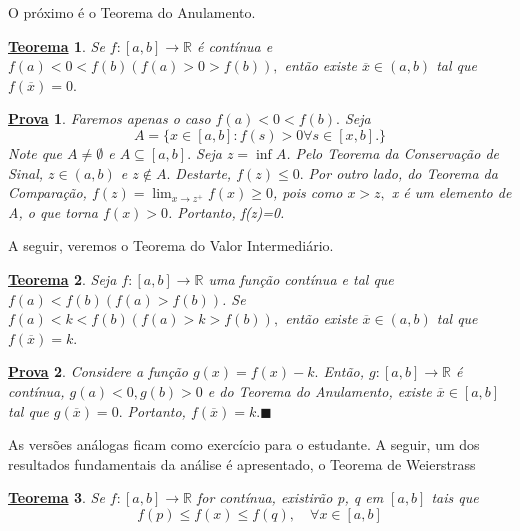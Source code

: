 \documentclass{article}
\newtheorem*{theorem*}{\underline{Teorema}}
\newtheorem*{proof*}{\underline{Prova}}
\renewcommand\qedsymbol{$\blacksquare$}
\begin{document}
 O pr\'oximo \'e o Teorema do Anulamento.
 \begin{theorem*}
   Se $f:[a,b]\rightarrow \mathbb{R}$ \'e cont\'inua e $f(a)<0<f(b) (f(a)>0>f(b)),$ ent\~ao existe $\overline{x}\in(a, b)$ tal que $f(\overline{x}) =0.$
 \end{theorem*}
\begin{proof*}
  Faremos apenas o caso $f(a)<0<f(b).$ Seja 
    $$
    A = \{x\in[a,b]:f(s)>0 \forall s\in[x, b].\}
    $$
    Note que $A\neq\emptyset$ e $A\subseteq{[a, b]}.$ Seja $z =\inf{A}$. Pelo Teorema da Conserva\c c\~ao de Sinal,
    $z\in(a, b)$ e $z\not\in A.$ Destarte, $f(z)\leq{0}.$ Por outro lado, do Teorema da Compara\c c\~ao, $f(z)=
    \lim_{x\to z^{+}}f(x)\geq{0}$, pois como $x > z,$ x \'e um elemento de A, o que torna $f(x)>0$. Portanto, f(z)=0.
\end{proof*}
 A seguir, veremos o Teorema do Valor Intermedi\'ario.
\begin{theorem*}
  Seja $f:[a, b]\rightarrow \mathbb{R}$ uma fun\c c\~ao cont\'inua e tal que  $f(a)<f(b)(f(a)>f(b))$. Se $f(a)<k<f(b)(f(a)>k>f(b)),$
  ent\~ao existe $\overline{x}\in(a, b)$ tal que $f(\overline{x})=k.$
\end{theorem*}
\begin{proof*}
  Considere a fun\c c\~ao $g(x)=f(x)-k.$ Ent\~ao, $g:[a, b]\rightarrow \mathbb{R}$ \'e cont\'inua, $g(a)<0, g(b)>0$
  e do Teorema do Anulamento, existe $\overline{x}\in[a, b]$ tal que $g(\overline{x})=0.$ Portanto, $f(\overline{x})=k.$\qedsymbol
\end{proof*}
As vers\~oes an\'alogas ficam como exerc\'icio para o estudante.
A seguir, um dos resultados fundamentais da an\'alise \'e apresentado, o Teorema de Weierstrass
\begin{theorem*}
  Se $f:[a, b]\rightarrow \mathbb{R}$ for cont\'inua, existir\~ao p, q em $[a, b]$ tais que 
    $$
    f(p)\leq f(x)\leq f(q),\quad \forall x\in[a,b]
    $$
\end{theorem*}
\end{document}
